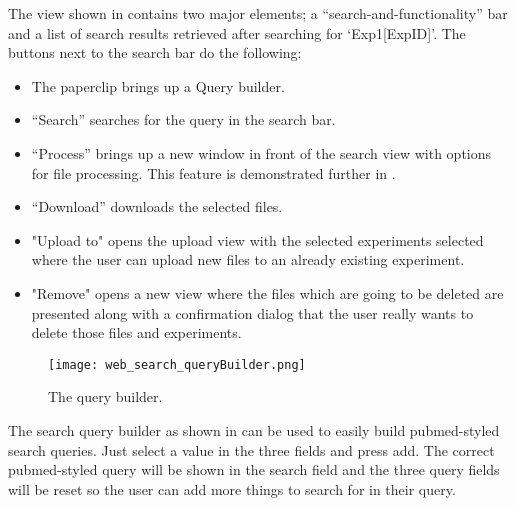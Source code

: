 The view shown in  contains two major elements; a “search-and-functionality” bar and a list of search results retrieved after searching for ‘Exp1[ExpID]’. The buttons next to the search bar do the following: 
\begin{itemize}
	\item The paperclip brings up a Query builder.
	\item “Search” searches for the query in the search bar. 
	\item “Process” brings up a new window in front of the search view with options for file processing. This feature is demonstrated further in .
    \item “Download” downloads the selected files. 
    \item "Upload to" opens the upload view with the selected experiments selected where the user can upload new files to an already existing experiment.
    \item "Remove" opens a new view where the files which are going to be deleted are presented along with a confirmation dialog that the user really wants to delete those files and experiments.
\end{itemize}
\begin{sidewaysfigure}[h]
\centering
\texttt{[image: web\_search\_queryBuilder.png]}
\caption{\label{fig:web_search_queryBuilder}The query builder.}
\end{sidewaysfigure}
The search query builder as shown in  can be used to easily build pubmed-styled search queries. Just select a value in the three fields and press add. The correct pubmed-styled query will be shown in the search field and the three query fields will be reset so the user can add more things to search for in their query.


